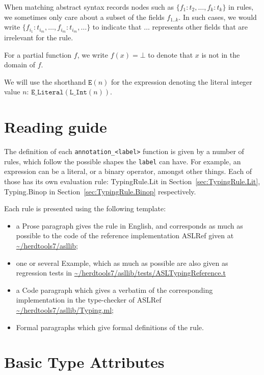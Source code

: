 \documentclass{book}
\begin{document}
When matching abstract syntax records nodes such as $\{f_1:t_2,\ldots,f_k:t_k\}$ in rules, we sometimes only care about a subset of the fields $f_{1..k}$.
In such cases, we would write $\{f_{i_1}:t_{i_m},\ldots,f_{i_m}:t_{i_m},\ldots\}$ to indicate that $\ldots$ represents other fields that are irrelevant for the rule.

For a partial function $f$, we write $f(x) = \bot$ to denote that $x$ is not in the domain of $f$.

\newcommand\Elit[1]{\texttt{E}(#1)}
We will use the shorthand $\Elit{n}$ for the expression denoting the literal integer value $n$: $\texttt{E\_Literal}(\texttt{L\_Int}(n))$.

\chapter{Reading guide}

The definition of each \texttt{annotation\_<label>} function is given by a number of
rules, which follow the possible shapes the \texttt{label} can have. For 
example, an expression can be a literal, or a binary operator, amongst other
things. Each of those has its own evaluation rule: TypingRule.Lit in
Section~\ref{sec:TypingRule.Lit}, Typing.Binop in
Section~\ref{sec:TypingRule.Binop} respectively.

Each rule is presented using the following template:
\begin{itemize}
\item a Prose paragraph gives the rule in English, and corresponds as much as possible to the code of the reference implementation ASLRef given at \url{~/herdtools7/asllib};
\item one or several Example, which as much as possible are also given as regression tests in \url{~/herdtools7/asllib/tests/ASLTypingReference.t}
\item a Code paragraph which gives a verbatim of the corresponding implementation in the type-checker of ASLRef \url{~/herdtools7/asllib/Typing.ml};
\item Formal paragraphs which give formal definitions of the rule.
\end{itemize}

\chapter{Basic Type Attributes}
\end{document}
